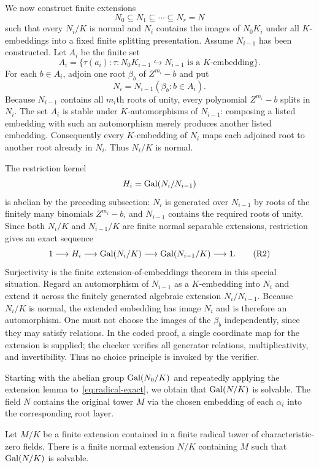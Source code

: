 We now construct finite extensions
\[
 N_0\subseteq N_1\subseteq\cdots\subseteq N_r=N
\]
such that every $N_i/K$ is normal and $N_i$ contains the images of
$N_0K_i$ under all $K$-embeddings into a fixed finite splitting presentation.
Assume $N_{i-1}$ has been constructed.  Let $A_i$ be the finite set
\[
 A_i=\bigl\{\tau(a_i):
   \tau:N_0K_{i-1}\hookrightarrow N_{i-1}
   \text{ is a $K$-embedding}\bigr\}.
\]
For each $b\in A_i$, adjoin one root $\beta_b$ of $Z^{m_i}-b$ and put
\[
 N_i=N_{i-1}(\beta_b:b\in A_i).
\]
Because $N_{i-1}$ contains all $m_i$th roots of unity, every polynomial
$Z^{m_i}-b$ splits in $N_i$.  The set $A_i$ is stable under
$K$-automorphisms of $N_{i-1}$: composing a listed embedding with such an
automorphism merely produces another listed embedding.  Consequently every
$K$-embedding of $N_i$ maps each adjoined root to another root already in
$N_i$.  Thus $N_i/K$ is normal.

The restriction kernel
\[
 H_i=\operatorname{Gal}(N_i/N_{i-1})
\]
is abelian by the preceding subsection: $N_i$ is generated over $N_{i-1}$ by
roots of the finitely many binomials $Z^{m_i}-b$, and $N_{i-1}$ contains the
required roots of unity.  Since both $N_i/K$ and $N_{i-1}/K$ are finite
normal separable extensions, restriction gives an exact sequence
\[
 1\longrightarrow H_i
 \longrightarrow \operatorname{Gal}(N_i/K)
 \longrightarrow \operatorname{Gal}(N_{i-1}/K)
 \longrightarrow1.
 \tag{R2}\label{eq:radical-exact}
\]
Surjectivity is the finite extension-of-embeddings theorem in this
special situation.  Regard an automorphism of $N_{i-1}$ as a $K$-embedding
into $N_i$ and extend it across the finitely generated algebraic extension
$N_i/N_{i-1}$.  Because $N_i/K$ is normal, the extended embedding has image
$N_i$ and is therefore an automorphism.  One must not choose the images of the
$\beta_b$ independently, since they may satisfy relations.  In the coded
proof, a single coordinate map for the extension is supplied; the checker
verifies all generator relations, multiplicativity, and invertibility.  Thus
no choice principle is invoked by the verifier.

Starting with the abelian group $\operatorname{Gal}(N_0/K)$ and repeatedly applying the
extension lemma to~\eqref{eq:radical-exact}, we obtain that
$\operatorname{Gal}(N/K)$ is solvable.  The field $N$ contains the original tower $M$ via
the chosen embedding of each $\alpha_i$ into the corresponding root layer.

\begin{theorem}
\label{thm:radical-group-solvable}
Let $M/K$ be a finite extension contained in a finite radical tower of
characteristic-zero fields.  There is a finite normal extension $N/K$
containing $M$ such that $\operatorname{Gal}(N/K)$ is solvable.
\end{theorem}

